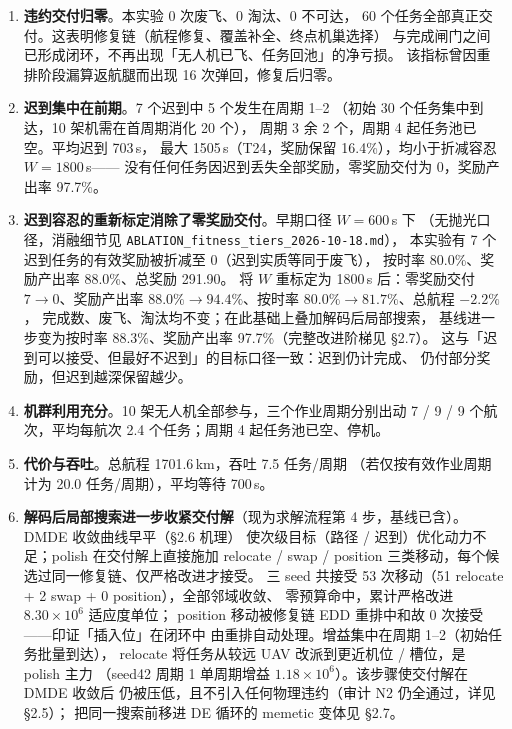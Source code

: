 \documentclass[a4paper,11pt]{article}
\begin{document}
\begin{enumerate}
  \item \textbf{违约交付归零}。本实验 0 次废飞、0 淘汰、0 不可达，
        60 个任务全部真正交付。这表明修复链（航程修复、覆盖补全、终点机巢选择）
        与完成闸门之间已形成闭环，不再出现「无人机已飞、任务回池」的净亏损。
        该指标曾因重排阶段漏算返航腿而出现 16 次弹回，修复后归零。
  \item \textbf{迟到集中在前期}。7 个迟到中 5 个发生在周期 1--2
        （初始 30 个任务集中到达，10 架机需在首周期消化 20 个），
        周期 3 余 2 个，周期 4 起任务池已空。平均迟到 703\,s，
        最大 1505\,s（T24，奖励保留 16.4\%），均小于折减容忍 $W=1800$\,s——
        没有任何任务因迟到丢失全部奖励，零奖励交付为 0，奖励产出率 97.7\%。
  \item \textbf{迟到容忍的重新标定消除了零奖励交付}。早期口径 $W=600$\,s 下
        （无抛光口径，消融细节见 \texttt{ABLATION\_fitness\_tiers\_2026-10-18.md}），
        本实验有 7 个迟到任务的有效奖励被折减至 0（迟到实质等同于废飞），
        按时率 80.0\%、奖励产出率 88.0\%、总奖励 291.90。
        将 $W$ 重标定为 1800\,s 后：零奖励交付 $7\to 0$、奖励产出率
        $88.0\%\to 94.4\%$、按时率 $80.0\%\to 81.7\%$、总航程 $-2.2\%$，
        完成数、废飞、淘汰均不变；在此基础上叠加解码后局部搜索，
        基线进一步变为按时率 88.3\%、奖励产出率 97.7\%（完整改进阶梯见 \S 2.7）。
        这与「迟到可以接受、但最好不迟到」的目标口径一致：迟到仍计完成、
        仍付部分奖励，但迟到越深保留越少。
  \item \textbf{机群利用充分}。10 架无人机全部参与，三个作业周期分别出动
        7 / 9 / 9 个航次，平均每航次 2.4 个任务；周期 4 起任务池已空、停机。
  \item \textbf{代价与吞吐}。总航程 1701.6\,km，吞吐 7.5 任务/周期
        （若仅按有效作业周期计为 20.0 任务/周期），平均等待 700\,s。
  \item \textbf{解码后局部搜索进一步收紧交付解}（现为求解流程第 4 步，基线已含）。
        DMDE 收敛曲线早平（\S 2.6 机理）
        使次级目标（路径 / 迟到）优化动力不足；polish 在交付解上直接施加
        relocate / swap / position 三类移动，每个候选过同一修复链、仅严格改进才接受。
        三 seed 共接受 53 次移动（51 relocate + 2 swap + 0 position），全部邻域收敛、
        零预算命中，累计严格改进 $8.30\times10^6$ 适应度单位；
        position 移动被修复链 EDD 重排中和故 0 次接受——印证「插入位」在闭环中
        由重排自动处理。增益集中在周期 1--2（初始任务批量到达），
        relocate 将任务从较远 UAV 改派到更近机位 / 槽位，是 polish 主力
        （seed42 周期 1 单周期增益 $1.18\times10^6$）。该步骤使交付解在 DMDE 收敛后
        仍被压低，且不引入任何物理违约（审计 N2 仍全通过，详见 \S 2.5）；
        把同一搜索前移进 DE 循环的 memetic 变体见 \S 2.7。
\end{enumerate}
\end{document}
